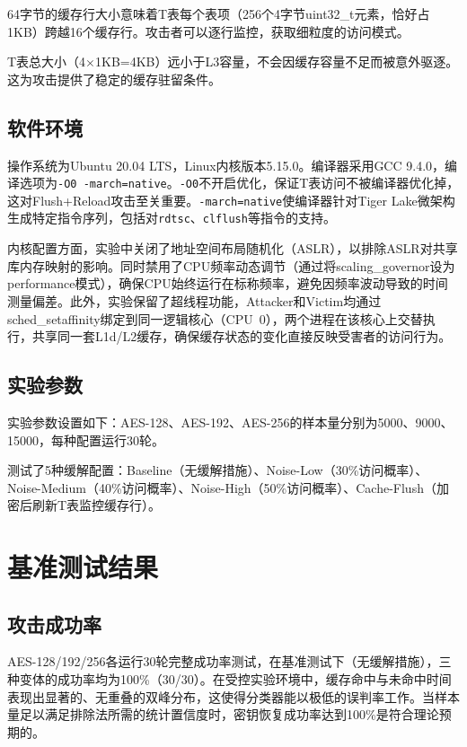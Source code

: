 64字节的缓存行大小意味着T表每个表项（256个4字节uint32\_t元素，恰好占1KB）跨越16个缓存行。攻击者可以逐行监控，获取细粒度的访问模式。

T表总大小（4$\times$1KB=4KB）远小于L3容量，不会因缓存容量不足而被意外驱逐。这为攻击提供了稳定的缓存驻留条件。

\subsection{软件环境}

操作系统为Ubuntu 20.04 LTS，Linux内核版本5.15.0。编译器采用GCC 9.4.0，编译选项为\texttt{-O0 -march=native}。\texttt{-O0}不开启优化，保证T表访问不被编译器优化掉，这对Flush+Reload攻击至关重要。\texttt{-march=native}使编译器针对Tiger Lake微架构生成特定指令序列，包括对\texttt{rdtsc}、\texttt{clflush}等指令的支持。

内核配置方面，实验中关闭了地址空间布局随机化（ASLR），以排除ASLR对共享库内存映射的影响。同时禁用了CPU频率动态调节（通过将scaling\_governor设为performance模式），确保CPU始终运行在标称频率，避免因频率波动导致的时间测量偏差。此外，实验保留了超线程功能，Attacker和Victim均通过sched\_setaffinity绑定到同一逻辑核心（CPU~0），两个进程在该核心上交替执行，共享同一套L1d/L2缓存，确保缓存状态的变化直接反映受害者的访问行为。

\subsection{实验参数}

实验参数设置如下：AES-128、AES-192、AES-256的样本量分别为5000、9000、15000，每种配置运行30轮。

测试了5种缓解配置：Baseline（无缓解措施）、Noise-Low（30\%访问概率）、Noise-Medium（40\%访问概率）、Noise-High（50\%访问概率）、Cache-Flush（加密后刷新T表监控缓存行）。

\section{基准测试结果}

\subsection{攻击成功率}

AES-128/192/256各运行30轮完整成功率测试，在基准测试下（无缓解措施），三种变体的成功率均为100\%（30/30）。在受控实验环境中，缓存命中与未命中时间表现出显著的、无重叠的双峰分布，这使得分类器能以极低的误判率工作。当样本量足以满足排除法所需的统计置信度时，密钥恢复成功率达到100\%是符合理论预期的。


